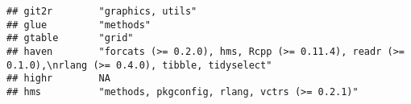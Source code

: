 \documentclass[]{book}
\begin{document}
\begin{verbatim}
## git2r        "graphics, utils"                                                                                                                                                                                                                                                                                                                                                                                                                                                                                           
## glue         "methods"                                                                                                                                                                                                                                                                                                                                                                                                                                                                                                   
## gtable       "grid"                                                                                                                                                                                                                                                                                                                                                                                                                                                                                                      
## haven        "forcats (>= 0.2.0), hms, Rcpp (>= 0.11.4), readr (>= 0.1.0),\nrlang (>= 0.4.0), tibble, tidyselect"                                                                                                                                                                                                                                                                                                                                                                                                        
## highr        NA                                                                                                                                                                                                                                                                                                                                                                                                                                                                                                          
## hms          "methods, pkgconfig, rlang, vctrs (>= 0.2.1)"                                                                                                                                                                                                                                                                                                                                                                                                                                                               

\end{verbatim}
\end{document}
